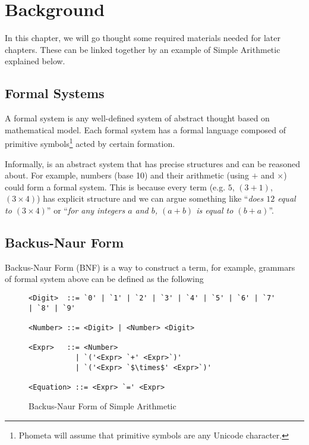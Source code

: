 \documentclass[master.tex]{subfiles}
\begin{document}
\chapter{Background}
\label{chap:background}

In this chapter, we will go thought some required materials needed for later
chapters. These can be linked together by an example of Simple Arithmetic
explained below.

\hspace{1ex}

\section{Formal Systems}

A formal system is any well-defined system of abstract thought based on
mathematical model\supercite{formal-system-wiki}. Each formal system has a
formal language composed of primitive symbols\footnote{Phometa will assume that
  primitive symbols are any Unicode character.} acted by certain
formation\supercite{formal-system-britannica}.

Informally, is an abstract system that has precise structures and can be
reasoned about. For example, numbers (base 10) and their arithmetic (using $+$
and $\times$) could form a formal system. This is because every term (e.g. $5$,
$(3 + 1)$, $(3 \times 4)$) has explicit structure and we can argue something
like ``\emph{does $12$ equal to $(3 \times 4)$}'' or ``\emph{for any integers
  $a$ and $b$, $(a + b)$ is equal to $(b + a)$}''.

\hspace{1ex}

\section{Backus-Naur Form}

Backus-Naur Form (BNF) is a way to construct a term, for example, grammars of
formal system above can be defined as the following

\hspace{1ex}

\begin{figure}[H]
\begin{framed}
\begin{lstlisting}[style=bnf]
<Digit>  ::= `0' | `1' | `2' | `3' | `4' | `5' | `6' | `7' | `8' | `9'

<Number> ::= <Digit> | <Number> <Digit>

<Expr>   ::= <Number>
           | `('<Expr> `+' <Expr>`)'
           | `('<Expr> `$\times$' <Expr>`)'

<Equation> ::= <Expr> `=' <Expr>
\end{lstlisting}
\end{framed}
\caption{Backus-Naur Form of Simple Arithmetic}
\label{fig:background-bnf}
\end{figure}
\end{document}
